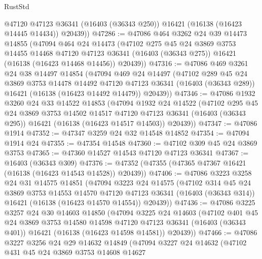\begin{lexlean}{RustStd}
\begin{coremodule}
        @47120
        @47123
        @36341
        (@16403 (@36343 @250))
        @16421
        (@16138 (@16423 @14445 @14434))
        @20439))
@47286 := @47086
    @464
    @3262
    @24
    @39
    @14473
    @14855
    (@47094
      @464
      @24
      @14473
      (@47102
        @275
        @45
        @24
        @3869
        @3753
        @14455
        @14468
        @47120
        @47123
        @36341
        (@16403 (@36343 @275))
        @16421
        (@16138 (@16423 @14468 @14456))
        @20439))
@47316 := @47086
    @469
    @3261
    @24
    @38
    @14497
    @14854
    (@47094
      @469
      @24
      @14497
      (@47102
        @289
        @45
        @24
        @3869
        @3753
        @14478
        @14492
        @47120
        @47123
        @36341
        (@16403 (@36343 @289))
        @16421
        (@16138 (@16423 @14492 @14479))
        @20439))
@47346 := @47086
    @1932
    @3260
    @24
    @33
    @14522
    @14853
    (@47094
      @1932
      @24
      @14522
      (@47102
        @295
        @45
        @24
        @3869
        @3753
        @14502
        @14517
        @47120
        @47123
        @36341
        (@16403 (@36343 @295))
        @16421
        (@16138 (@16423 @14517 @14503))
        @20439))
@47347 := @47086 @1914
@47352 := @47347 @3259 @24 @32 @14548 @14852
@47354 := @47094 @1914 @24
@47355 := @47354 @14548
@47360 := @47102 @309 @45 @24 @3869 @3753
@47365 := @47360 @14527 @14543 @47120 @47123 @36341
@47367 := @16403 (@36343 @309)
@47376 := @47352 (@47355 (@47365 @47367 @16421 (@16138 (@16423 @14543 @14528)) @20439))
@47406 := @47086
    @3223
    @3258
    @24
    @31
    @14575
    @14851
    (@47094
      @3223
      @24
      @14575
      (@47102
        @314
        @45
        @24
        @3869
        @3753
        @14553
        @14570
        @47120
        @47123
        @36341
        (@16403 (@36343 @314))
        @16421
        (@16138 (@16423 @14570 @14554))
        @20439))
@47436 := @47086
    @3225
    @3257
    @24
    @30
    @14603
    @14850
    (@47094
      @3225
      @24
      @14603
      (@47102
        @401
        @45
        @24
        @3869
        @3753
        @14580
        @14598
        @47120
        @47123
        @36341
        (@16403 (@36343 @401))
        @16421
        (@16138 (@16423 @14598 @14581))
        @20439))
@47466 := @47086
    @3227
    @3256
    @24
    @29
    @14632
    @14849
    (@47094
      @3227
      @24
      @14632
      (@47102
        @431
        @45
        @24
        @3869
        @3753
        @14608
        @14627

\end{coremodule}
\end{lexlean}
